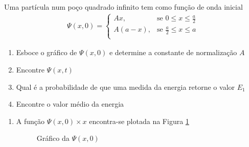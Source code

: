 \begin{prob}
	Uma partícula num poço quadrado infinito tem como função de onda inicial
	\begin{eqnarray*}
		\Psi(x,0)=
		\begin{cases}
			Ax, &\text{se $0\leq x \leq \frac{a}{2}$}\\
			A \left(a-x\right), &\text{se $\frac{a}{2}\leq x\leq a$}\\
		\end{cases}
	\end{eqnarray*}
	\begin{enumerate}[label=\alph *)]
		\item Esboce o gráfico de $\Psi(x,0)$ e determine a constante de normalização $A$
		\item Encontre $\Psi(x,t)$
		\item Qual é a probabilidade de que uma medida da energia retorne o valor $E_{1}$
		\item Encontre o valor médio da energia
	\end{enumerate}
	\begin{sol}
		\begin{enumerate}[label=\alph *)]
			\item A função $\Psi(x,0)\times x$ encontra-se plotada na Figura \ref{fig:pltQ05a}

				\begin{figure}[ht!]
					\centering
					
					\caption{Gráfico da $\Psi(x,0)$}
					\label{fig:pltQ05a}
				\end{figure}


\end{enumerate}
\end{sol}
\end{prob}
